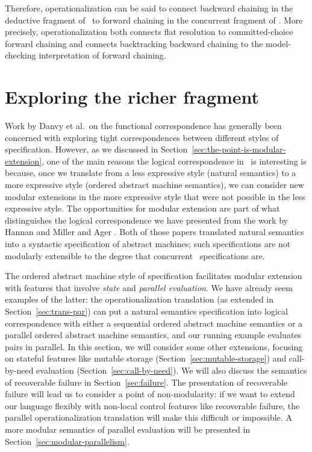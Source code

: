 Therefore, operationalization can be said to connect backward
chaining in the deductive fragment of \sls~to forward chaining in the
concurrent fragment of \sls. More precisely, operationalization both
connects flat resolution to committed-choice forward chaining and
connects backtracking backward chaining to the model-checking
interpretation of forward chaining.

\section{Exploring the richer fragment}
\label{sec:richer-ordered-abstract}

Work by Danvy et al.~on the functional correspondence has generally
been concerned with
exploring tight correspondences between different styles of
specification. However, as we discussed in
Section~\ref{sec:the-point-is-modular-extension}, one of the main
reasons the logical correspondence in \sls~is interesting is because,
once we translate from a less expressive style (natural
semantics) to a more expressive style (ordered abstract machine
semantics), we can consider new modular extensions in the more
expressive style that were not possible in the less expressive
style. The opportunities for modular extension are part of what
distinguishes the logical correspondence we have presented from the
work by Hannan and Miller \cite{hannan92operational} and Ager
\cite{ager04natural}. Both of those papers translated natural
semantics into a syntactic specification of abstract machines; such
specifications are not modularly extensible to the degree that
concurrent \sls~specifications are.

The ordered abstract machine style of specification facilitates
modular extension with features that involve {\it state} and {\it
  parallel evaluation}. We have already seem examples of the latter:
the operationalization translation (as extended in
Section~\ref{sec:trans-par}) can put a natural semantics specification
into logical correspondence with either a sequential ordered abstract
machine semantics or a parallel ordered abstract machine semantics,
and our running example evaluates pairs in parallel. In this section,
we will consider some other extensions, focusing on stateful features
like mutable storage (Section~\ref{sec:mutable-storage}) and
call-by-need evaluation (Section~\ref{sec:call-by-need}). We will also
discuss the semantics of recoverable failure in
Section~\ref{sec:failure}. The presentation of recoverable failure
will lead us to consider a point of non-modularity: if we want to
extend our language flexibly with non-local control features like
recoverable failure, the parallel operationalization translation will
make this difficult or impossible.  A more modular semantics of
parallel evaluation will be presented in
Section~\ref{sec:modular-parallelism}.

